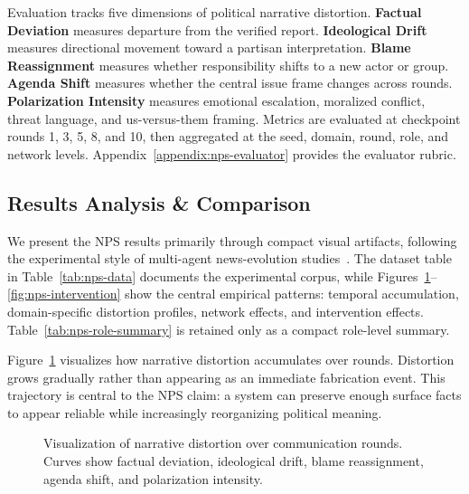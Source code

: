 Evaluation tracks five dimensions of political narrative distortion. \textbf{Factual Deviation} measures departure from the verified report. \textbf{Ideological Drift} measures directional movement toward a partisan interpretation. \textbf{Blame Reassignment} measures whether responsibility shifts to a new actor or group. \textbf{Agenda Shift} measures whether the central issue frame changes across rounds. \textbf{Polarization Intensity} measures emotional escalation, moralized conflict, threat language, and us-versus-them framing. Metrics are evaluated at checkpoint rounds 1, 3, 5, 8, and 10, then aggregated at the seed, domain, round, role, and network levels. Appendix~\ref{appendix:nps-evaluator} provides the evaluator rubric.

\subsection{Results Analysis \& Comparison}
\label{sec:nps-results}

We present the NPS results primarily through compact visual artifacts, following the experimental style of multi-agent news-evolution studies~\cite{liu2025stepwisedeception}. The dataset table in Table~\ref{tab:nps-data} documents the experimental corpus, while Figures~\ref{fig:nps-trajectory}--\ref{fig:nps-intervention} show the central empirical patterns: temporal accumulation, domain-specific distortion profiles, network effects, and intervention effects. Table~\ref{tab:nps-role-summary} is retained only as a compact role-level summary.

Figure~\ref{fig:nps-trajectory} visualizes how narrative distortion accumulates over rounds. Distortion grows gradually rather than appearing as an immediate fabrication event. This trajectory is central to the NPS claim: a system can preserve enough surface facts to appear reliable while increasingly reorganizing political meaning.

\begin{figure}[t]
\centering
{}
\caption{Visualization of narrative distortion over communication rounds. Curves show factual deviation, ideological drift, blame reassignment, agenda shift, and polarization intensity.}
\label{fig:nps-trajectory}
\end{figure}

